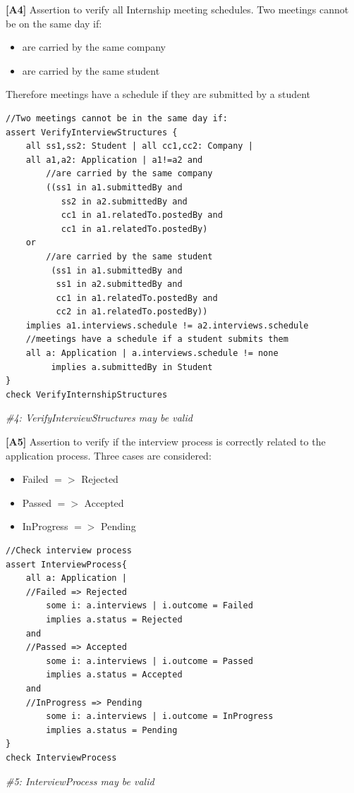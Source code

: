 \pagebreak
\textbf{[A4]} Assertion to verify all Internship meeting schedules. Two meetings cannot be on the same day if:
\begin{itemize}
    \item are carried by the same company
    \item are carried by the same student
\end{itemize}
Therefore meetings have a schedule if they are submitted by a student
\begin{lstlisting}
//Two meetings cannot be in the same day if:
assert VerifyInterviewStructures {
	all ss1,ss2: Student | all cc1,cc2: Company |
   	all a1,a2: Application | a1!=a2 and
		//are carried by the same company
   		((ss1 in a1.submittedBy and 
		   ss2 in a2.submittedBy and
   		   cc1 in a1.relatedTo.postedBy and
		   cc1 in a1.relatedTo.postedBy)
   	or
		//are carried by the same student
   		 (ss1 in a1.submittedBy and 
		  ss1 in a2.submittedBy and
   		  cc1 in a1.relatedTo.postedBy and 
		  cc2 in a1.relatedTo.postedBy))
   	implies a1.interviews.schedule != a2.interviews.schedule
  	//meetings have a schedule if a student submits them
   	all a: Application | a.interviews.schedule != none 
   		 implies a.submittedBy in Student
}
check VerifyInternshipStructures
\end{lstlisting}
\textit{\#4: VerifyInterviewStructures may be valid}

\pagebreak
\textbf{[A5]} Assertion to verify if the interview process is correctly related to the application process. Three cases are considered:
\begin{itemize}
    \item Failed $=>$ Rejected
    \item Passed $=>$ Accepted
    \item InProgress $=>$ Pending
\end{itemize}
\begin{lstlisting}
//Check interview process
assert InterviewProcess{
    all a: Application | 
	//Failed => Rejected
        some i: a.interviews | i.outcome = Failed 
		implies a.status = Rejected
	and 
	//Passed => Accepted
        some i: a.interviews | i.outcome = Passed 
		implies a.status = Accepted
	and
	//InProgress => Pending
        some i: a.interviews | i.outcome = InProgress 
		implies a.status = Pending
}
check InterviewProcess
\end{lstlisting}
\textit{\#5: InterviewProcess may be valid}